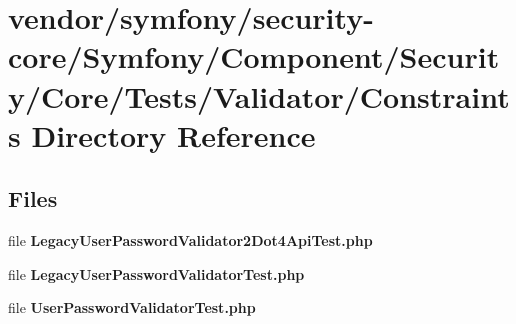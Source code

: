 \section{vendor/symfony/security-\/core/\+Symfony/\+Component/\+Security/\+Core/\+Tests/\+Validator/\+Constraints Directory Reference}
\label{dir_67584372c37562299691ba15d0e39194}
\subsection*{Files}
\begin{DoxyCompactItemize}
\item 
file {\bf Legacy\+User\+Password\+Validator2\+Dot4\+Api\+Test.\+php}
\item 
file {\bf Legacy\+User\+Password\+Validator\+Test.\+php}
\item 
file {\bf User\+Password\+Validator\+Test.\+php}
\end{DoxyCompactItemize}
